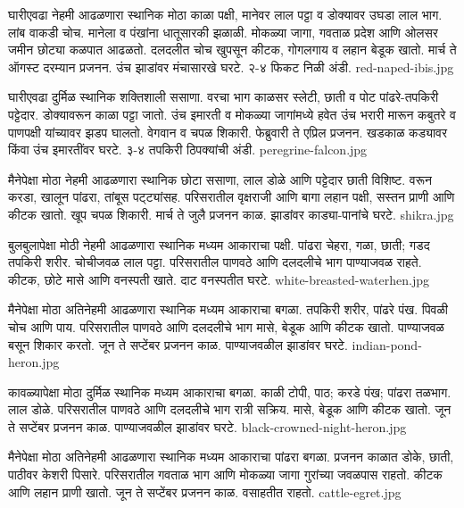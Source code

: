 \documentclass[aspectratio=169]{beamer}
\begin{document}
{घारीएवढा}
{नेहमी आढळणारा स्थानिक}
{मोठा काळा पक्षी, मानेवर लाल पट्टा व डोक्यावर उघडा लाल भाग. लांब वाकडी चोच. मानेला व पंखांना धातूसारकी झळाळी.}
{मोकळ्या जागा, गवताळ प्रदेश आणि ओलसर जमीन}
{छोट्या कळपात आढळतो. दलदलीत चोच खुपसून कीटक, गोगलगाय व लहान बेडूक खातो.}
{मार्च ते ऑगस्ट दरम्यान प्रजनन. उंच झाडांवर मंचासारखे घरटे. २-४ फिकट निळी अंडी.}
{red-naped-ibis.jpg}

{घारीएवढा}
{दुर्मिळ स्थानिक}
{शक्तिशाली ससाणा. वरचा भाग काळसर स्लेटी, छाती व पोट पांढरे-तपकिरी पट्टेदार. डोक्यावरून काळा पट्टा जातो.}
{उंच इमारती व मोकळ्या जागांमध्ये}
{हवेत उंच भरारी मारून कबुतरे व पाणपक्षी यांच्यावर झडप घालतो. वेगवान व चपळ शिकारी.}
{फेब्रुवारी ते एप्रिल प्रजनन. खडकाळ कड्यावर किंवा उंच इमारतींवर घरटे. ३-४ तपकिरी ठिपक्यांची अंडी.}
{peregrine-falcon.jpg}

{मैनेपेक्षा मोठा}
{नेहमी आढळणारा स्थानिक}
{छोटा ससाणा, लाल डोळे आणि पट्टेदार छाती विशिष्ट. वरून करडा, खालून पांढरा, तांबूस पट्ट्यांसह.}
{परिसरातील वृक्षराजी आणि बागा}
{लहान पक्षी, सस्तन प्राणी आणि कीटक खातो. खूप चपळ शिकारी.}
{मार्च ते जुलै प्रजनन काळ. झाडांवर काड्या-पानांचे घरटे.}
{shikra.jpg}

{बुलबुलापेक्षा मोठी}
{नेहमी आढळणारा स्थानिक}
{मध्यम आकाराचा पक्षी. पांढरा चेहरा, गळा, छाती; गडद तपकिरी शरीर. चोचीजवळ लाल पट्टा.}
{परिसरातील पाणवठे आणि दलदलीचे भाग}
{पाण्याजवळ राहते. कीटक, छोटे मासे आणि वनस्पती खाते.}
{दाट वनस्पतीत घरटे.}
{white-breasted-waterhen.jpg}

{मैनेपेक्षा मोठा}
{अतिनेहमी आढळणारा स्थानिक}
{मध्यम आकाराचा बगळा. तपकिरी शरीर, पांढरे पंख. पिवळी चोच आणि पाय.}
{परिसरातील पाणवठे आणि दलदलीचे भाग}
{मासे, बेडूक आणि कीटक खातो. पाण्याजवळ बसून शिकार करतो.}
{जून ते सप्टेंबर प्रजनन काळ. पाण्याजवळील झाडांवर घरटे.}
{indian-pond-heron.jpg}

{कावळ्यापेक्षा मोठा}
{दुर्मिळ स्थानिक}
{मध्यम आकाराचा बगळा. काळी टोपी, पाठ; करडे पंख; पांढरा तळभाग. लाल डोळे.}
{परिसरातील पाणवठे आणि दलदलीचे भाग}
{रात्री सक्रिय. मासे, बेडूक आणि कीटक खातो.}
{जून ते सप्टेंबर प्रजनन काळ. पाण्याजवळील झाडांवर घरटे.}
{black-crowned-night-heron.jpg}

{मैनेपेक्षा मोठा}
{अतिनेहमी आढळणारा स्थानिक}
{मध्यम आकाराचा पांढरा बगळा. प्रजनन काळात डोके, छाती, पाठीवर केशरी पिसारे.}
{परिसरातील गवताळ भाग आणि मोकळ्या जागा}
{गुरांच्या जवळपास राहतो. कीटक आणि लहान प्राणी खातो.}
{जून ते सप्टेंबर प्रजनन काळ. वसाहतीत राहतो.}
{cattle-egret.jpg}
\end{document}
